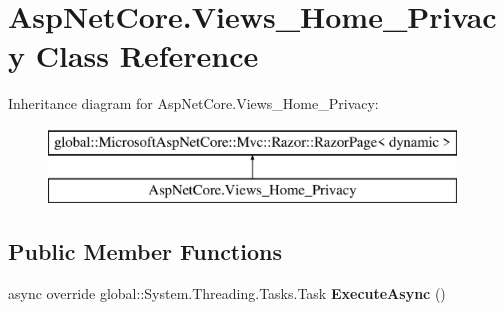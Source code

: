 \hypertarget{class_asp_net_core_1_1_views___home___privacy}{}\section{Asp\+Net\+Core.\+Views\+\_\+\+Home\+\_\+\+Privacy Class Reference}
\label{class_asp_net_core_1_1_views___home___privacy}
Inheritance diagram for Asp\+Net\+Core.\+Views\+\_\+\+Home\+\_\+\+Privacy\+:\begin{figure}[H]
\begin{center}
\leavevmode
\includegraphics[height=2.000000cm]{class_asp_net_core_1_1_views___home___privacy}
\end{center}
\end{figure}
\subsection*{Public Member Functions}
\begin{DoxyCompactItemize}
\item 
\mbox{\label{class_asp_net_core_1_1_views___home___privacy_a682549ce8097fa5a8b4e1629a32e5e93}} 
async override global\+::\+System.\+Threading.\+Tasks.\+Task {\bfseries Execute\+Async} ()
\end{DoxyCompactItemize}
